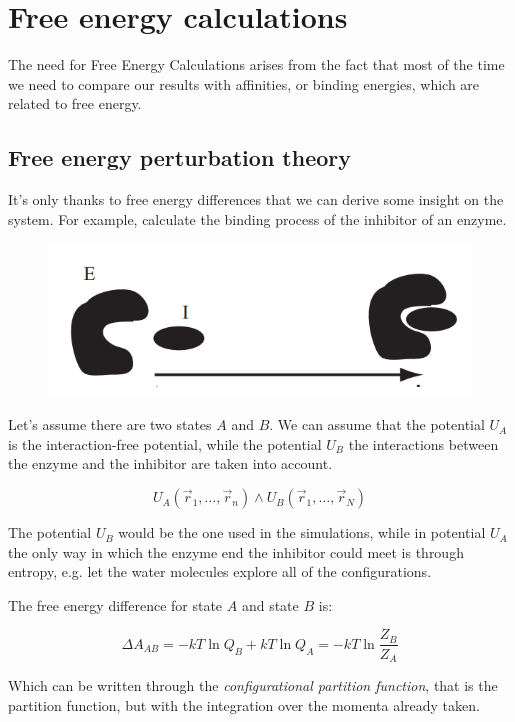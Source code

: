 \graphicspath{{chapters/18/images/}}
\chapter{Free energy calculations}

The need for Free Energy Calculations arises from the fact that most of the time we need to compare our results with affinities, or binding energies, which are related to free energy.
\section{Free energy perturbation theory}
It's only thanks to free energy differences that we can derive some insight on the system. 
For example, calculate the binding process of the inhibitor of an enzyme. 


\begin{figure}
\centering
\includegraphics[scale=0.4]{enzymes.png}
\end{figure}

Let's assume there are two states $A$ and $B$.
We can assume that the potential $U_A$ is the interaction-free potential, while the potential $U_B$ the interactions between the enzyme and the inhibitor are taken into account.

$$U_A(\vec{r}_1, \dots, \vec{r}_n)\land U_{B}(\vec{r}_1, \dots, \vec{r}_N)$$

The potential $U_B$ would be the one used in the simulations, while in potential $U_A$ the only way in which the enzyme end the inhibitor could meet is through entropy, e.g. let the water molecules explore all of the configurations.

The free energy difference for state $A$ and state $B$ is:

$$\Delta A_{AB} = -kT\ln Q_B + kT\ln Q_A = -kT\ln\frac{Z_B}{Z_A}$$

Which can be written through the \textit{configurational partition function}, that is the partition function, but with the integration over the momenta already taken.

